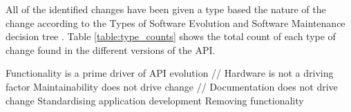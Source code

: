 \documentclass{sig-alternate}
\begin{document}



All of the identified changes have been given a type based the nature of the change according to the Types of Software Evolution and Software Maintenance decision tree \cite{chapin2001types}. Table \ref{table:type_counts} shows the total count of each type of change found in the different versions of the API.

Functionality is a prime driver of API evolution // Hardware is not a driving factor
Maintainability does not drive change // Documentation does not drive change
Standardising application development
Removing functionality


\end{document}
